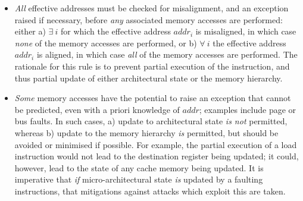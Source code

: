 \begin{itemize}

\item {\em All} effective addresses must be checked for misalignment, and
      an exception raised if necessary, before {\em any} associated memory 
      accesses are performed: either
      a) $\exists~i$ for which the effective address $addr_i$ is misaligned, 
         in which case {\em none} of the memory accesses are performed,
         or
      b) $\forall~i$           the effective address $addr_i$ is    aligned, 
         in which case {\em  all} of the memory accesses are performed.
      The rationale for this rule is to prevent partial execution of the
      instruction, and thus partial update of either architectural state
      or the memory hierarchy.

\item {\em Some} memory accesses have the potential to raise an exception
      that cannot be predicted, even with a priori knowledge of $addr$;
      examples include page or bus faults.  In such cases,
      a) update to 
         architectural state 
         {\em is not} permitted,
         whereas
      b) update to the 
         memory hierarchy
         {\em is}     permitted,
         but should be avoided or minimised if possible.
      For example, the partial execution of a load instruction would not
      lead to the destination register being updated; it could, however,
      lead to the state of any cache memory being updated.
      It is imperative that {\em if} micro-architectural state {\em is}
      updated by a faulting instructions, that mitigations against
      attacks which exploit this are taken.

\end{itemize}



